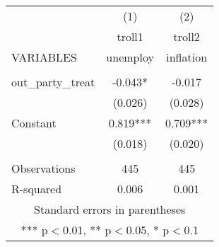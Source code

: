 \documentclass[]{article}
\begin{document}
\begin{tabular}{lcc} \hline
 & (1) & (2) \\
 & troll1 & troll2 \\
VARIABLES & unemploy & inflation \\ \hline
 &  &  \\
out\_party\_treat & -0.043* & -0.017 \\
 & (0.026) & (0.028) \\
Constant & 0.819*** & 0.709*** \\
 & (0.018) & (0.020) \\
 &  &  \\
Observations & 445 & 445 \\
 R-squared & 0.006 & 0.001 \\ \hline
\multicolumn{3}{c}{ Standard errors in parentheses} \\
\multicolumn{3}{c}{ *** p$<$0.01, ** p$<$0.05, * p$<$0.1} \\
\end{tabular}
\end{document}
